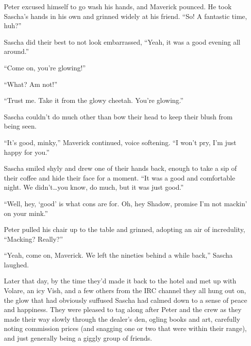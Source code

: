 Peter excused himself to go wash his hands, and Maverick pounced. He took Sascha's hands in his own and grinned widely at his friend. ``So! A fantastic time, huh?''

Sascha did their best to not look embarrassed, ``Yeah, it was a good evening all around.''

``Come on, you're glowing!''

``What? Am not!''

``Trust me. Take it from the glowy cheetah.  You're glowing.''

Sascha couldn't do much other than bow their head to keep their blush from being seen.

``It's good, minky,'' Maverick continued, voice softening. ``I won't pry, I'm just happy for you.''

Sascha smiled shyly and drew one of their hands back, enough to take a sip of their coffee and hide their face for a moment. ``It was a good and comfortable night. We didn't\ldots{}you know, do much, but it was just good.''

``Well, hey, `good' is what cons are for. Oh, hey Shadow, promise I'm not mackin' on your mink.''

Peter pulled his chair up to the table and grinned, adopting an air of incredulity, ``Macking? Really?''

``Yeah, come on, Maverick. We left the nineties behind a while back,'' Sascha laughed.

Later that day, by the time they'd made it back to the hotel and met up with Volare, an icy Vish, and a few others from the IRC channel they all hung out on, the glow that had obviously suffused Sascha had calmed down to a sense of peace and happiness. They were pleased to tag along after Peter and the crew as they made their way slowly through the dealer's den, ogling books and art, carefully noting commission prices (and snagging one or two that were within their range), and just generally being a giggly group of friends.
